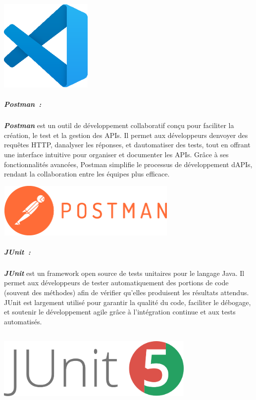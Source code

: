 \documentclass[12pt,a4paper,twoside,openright]{report}
\begin{document}
\includegraphics[width=1.76177in,height=1.76177in]{latex_media/media/image32.png}

\hypertarget{postman}{%
\subparagraph{Postman~:}\label{postman}}

\emph{\textbf{Postman}} est un outil de développement collaboratif conçu
pour faciliter la création, le test et la gestion des APIs. Il permet
aux développeurs d\textquotesingle envoyer des requêtes HTTP,
d\textquotesingle analyser les réponses, et
d\textquotesingle automatiser des tests, tout en offrant une interface
intuitive pour organiser et documenter les APIs. Grâce à ses
fonctionnalités avancées, Postman simplifie le processus de
développement d\textquotesingle APIs, rendant la collaboration entre les
équipes plus efficace.

\includegraphics[width=3.43681in,height=1.03958in]{latex_media/media/image33.png}

\hypertarget{junit}{%
\subparagraph{JUnit~:}\label{junit}}

\emph{\textbf{JUnit}} est un framework open source de tests unitaires
pour le langage Java. Il permet aux développeurs de tester
automatiquement des portions de code (souvent des méthodes) afin de
vérifier qu'elles produisent les résultats attendus. JUnit est largement
utilisé pour garantir la qualité du code, faciliter le débogage, et
soutenir le développement agile grâce à l'intégration continue et aux
tests automatisés.

\includegraphics[width=3.78403in,height=1.48333in]{latex_media/media/image34.png}
\end{document}
